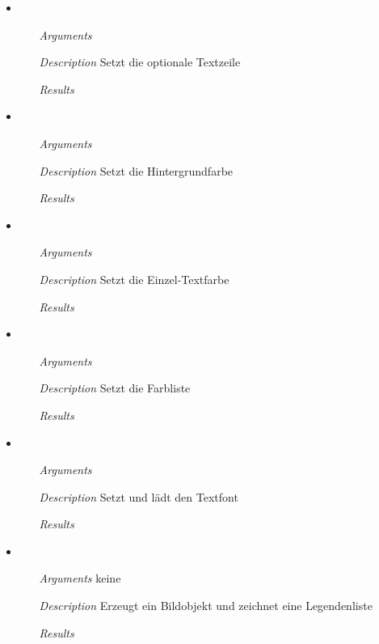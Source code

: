 \begin{itemize}
\item {}
\begin{enumerate}
\item[\textit{Arguments}] 
\item[\textit{Description}] Setzt die optionale Textzeile
\item[\textit{Results}] 
\end{enumerate}

\item {}
\begin{enumerate}
\item[\textit{Arguments}] 
\item[\textit{Description}] Setzt die Hintergrundfarbe
\item[\textit{Results}] 
\end{enumerate}

\item {}
\begin{enumerate}
\item[\textit{Arguments}] 
\item[\textit{Description}] Setzt die Einzel-Textfarbe
\item[\textit{Results}] 
\end{enumerate}

\item {}
\begin{enumerate}
\item[\textit{Arguments}] 
\item[\textit{Description}] Setzt die Farbliste
\item[\textit{Results}] 
\end{enumerate}

\item {}
\begin{enumerate}
\item[\textit{Arguments}] 
\item[\textit{Description}] Setzt und l\"adt den Textfont
\item[\textit{Results}] 
\end{enumerate}

\item {}
\begin{enumerate}
\item[\textit{Arguments}] keine
\item[\textit{Description}] Erzeugt ein Bildobjekt und zeichnet eine
  Legendenliste
\item[\textit{Results}] 
\end{enumerate}


\end{itemize}
